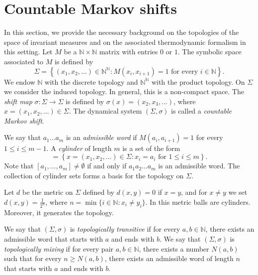 \documentclass[letterpaper,11pt]{amsart}
\numberwithin{equation}{section}     %
\newcommand{\N}{\mathbb{N}}
\def\N{{\mathbb N}}
\def\le{\leqslant}
\def\ge{\geqslant}
\begin{document}

\section{Countable Markov shifts}  \label{sec:cms}

In this section, we provide the necessary background on the topologies of the space of invariant measures and on the associated thermodynamic formalism in this setting. Let  $M$ be a $\N \times  \N$ matrix  with entries $0$ or $1$. The symbolic space associated to $M$ is defined by
 \begin{equation*}
 \Sigma=\left\{ (x_1, x_2, \dots) \in \N^{\N}: M(x_i,x_{i+1})=1 \text{ for every } i \in \N \right\}.
\end{equation*} 
We endow $\N$ with the discrete topology and $\N^{\N}$ with the product topology. On $\Sigma$ we consider the induced topology. In general, this is a non-compact space. The \emph{shift map} $\sigma:\Sigma \to \Sigma$ is defined by $\sigma(x)=(x_2,x_3,\ldots)$, where $x=(x_1, x_2, \dots ) \in \Sigma$. The dynamical system $(\Sigma,\sigma)$ is called  a  \emph{countable Markov shift}. 

We say that $a_1\ldots a_{m}$ is an \emph{admissible word} if $M(a_{i},a_{i+1})=1$ for every $1\le i\le m-1$. A \emph{cylinder} of length $m$ is a set of the form
\begin{equation*}
[a_1,\ldots,a_{m}]= \left\{ x=(x_1,x_2,\ldots)\in \Sigma :  x_i=a_i  \text{ for } 1 \le i \le m \right\}.
\end{equation*} 
Note that  $[a_1,\ldots,a_{m}] \neq \emptyset$ if and only if  $a_1a_2\ldots a_m$ is an admissible word. The collection of cylinder sets forms a basis for the topology on $\Sigma$. 

Let $d$ be the metric on $\Sigma$ defined by $d(x,y)=0$ if $x=y$, and for $x\ne y$ we set $d(x,y)=\frac{1}{2^n}$, where $n=\min\{i\in\N:x_i\ne y_i\}$. In this metric balls are cylinders. Moreover, it generates the topology.

We say that $(\Sigma,\sigma)$ is \emph{topologically transitive}  if for every $a, b \in \N$, there exists an admissible word that starts with $a$ and ends with $b$. We say that $(\Sigma,\sigma)$ is \emph{topologically mixing} if for every pair $a, b \in \N$, there exists a number $N(a,b)$ such that for every $n \ge N(a,b)$, there exists an admissible word of length $n$ that starts with $a$ and ends with $b$. 
\end{document}
